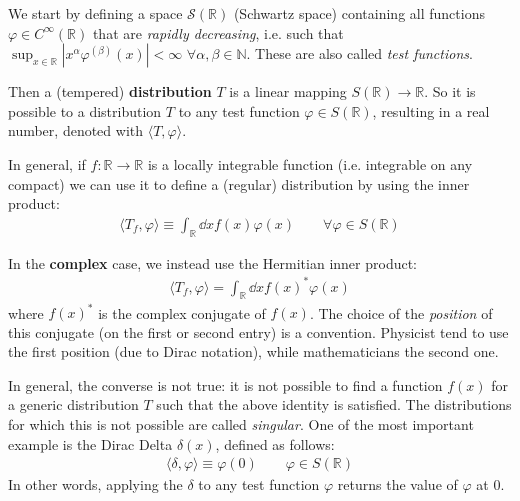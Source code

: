 \documentclass[../template.tex]{subfiles}
\begin{document}
We start by defining a space $\mathcal{S}(\mathbb{R})$ (Schwartz space) containing all functions $\varphi \in C^{\infty}(\mathbb{R})$ that are \textit{rapidly decreasing}, i.e. such that $\sup_{x \in \mathbb{R}} |x^\alpha \varphi^{(\beta)}(x)| < \infty$ $\forall \alpha, \beta \in \mathbb{N}$. These are also called \textit{test functions}. 

Then a (tempered) \textbf{distribution} $T$ is a linear mapping $S(\mathbb{R}) \to \mathbb{R}$. So it is possible to  a distribution $T$ to any test function $\varphi \in S(\mathbb{R})$, resulting in a real number, denoted with $\langle T, \varphi \rangle$.

In general, if $f\colon \mathbb{R} \to \mathbb{R}$ is a locally integrable function (i.e. integrable on any compact) we can use it to define a (regular) distribution by using the inner product:
\begin{align*}
    \langle T_f, \varphi \rangle \equiv \int_{\mathbb{R}} \dd{x} f(x)\varphi(x) \qquad \forall \varphi \in S(\mathbb{R})
\end{align*}

\begin{expl}In the \textbf{complex} case, we instead use the Hermitian inner product:
    \begin{align*}
        \langle T_f, \varphi \rangle = \int_{\mathbb{R}} \dd{x} f(x)^* \varphi(x)
    \end{align*} 
    where $f(x)^*$ is the complex conjugate of $f(x)$. The choice of the \textit{position} of this conjugate (on the first or second entry) is a convention. Physicist tend to use the first position (due to Dirac notation), while mathematicians the second one.
\end{expl}

In general, the converse is not true: it is not possible to find a function $f(x)$ for a generic distribution $T$ such that the above identity is satisfied. The distributions for which this is not possible are called \textit{singular}. One of the most important example is the Dirac Delta $\delta(x)$, defined as follows:
\begin{align*}
    \langle \delta, \varphi \rangle \equiv \varphi(0) \qquad \varphi \in S(\mathbb{R})
\end{align*} 
In other words, applying the $\delta$ to any test function $\varphi$ returns the value of $\varphi$ at $0$.
\end{document}

